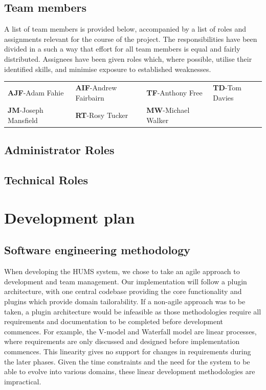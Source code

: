 \documentclass[10pt,a4paper]{article}
\begin{document}
\subsection{Team members}
A list of team members is provided below, accompanied by a list of roles and
assignments relevant for the course of the project. The responsibilities have
been divided in a such a way that effort for all team members is equal and
fairly distributed. Assignees have been given roles which, where possible,
utilise their identified skills, and minimise exposure to established
weaknesses.

\begin{tabular}{ p{4cm} p{4cm} p{4cm} p{4cm} }
	\textbf{AJF}-Adam Fahie & \textbf{AIF}-Andrew Fairbairn &
			\textbf{TF}-Anthony Free & \textbf{TD}-Tom Davies \\
	\textbf{JM}-Joseph Mansfield & \textbf{RT}-Rosy Tucker &
			\textbf{MW}-Michael Walker & \\
\end{tabular}
\subsection{Administrator Roles} 


\subsection{Technical Roles}



\section{Development plan}

\subsection{Software engineering methodology}
When developing the HUMS system, we chose to take an agile approach to
development and team management. Our implementation will follow a plugin
architecture, with one central codebase providing the core functionality and
plugins which provide domain tailorability. If a non-agile approach was to be
taken, a plugin architecture would be infeasible as those methodologies require
all requirements and documentation to be completed before development commences.
For example, the V-model and Waterfall model are linear processes, where
requirements are only discussed and designed before implementation commences.
This linearity gives no support for changes in requirements during the later
phases. Given the time constraints and the need for the system to be able to
evolve into various domains, these linear development methodologies are
impractical.
\end{document}
